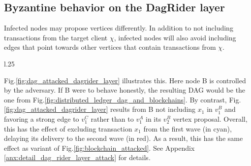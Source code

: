 


\subsection{Byzantine behavior on the DagRider layer\label{ssec:byz_dagrider_layer}}

Infected nodes may propose vertices differently.
In addition to not including transactions from the target client $\chi$, infected nodes will also avoid including edges that point towards other vertices that contain transactions from $\chi$.


\begin{wrapfigure}{l}{.25\textwidth}
\vspace*{-.3cm}
    \centering
    \scalebox{.75}{}
    \caption{DagRider layer attack}
    \label{fig:dag_attacked_dagrider_layer}
\vspace*{-.4cm}
\end{wrapfigure}

Fig.\ref{fig:dag_attacked_dagrider_layer} illustrates this.
Here node B is controlled by the adversary.
If B were to behave honestly, the resulting DAG would be the one from Fig.\ref{fig:distributed_ledger_dag_and_blockchains}.
By contrast, Fig.\ref{fig:dag_attacked_dagrider_layer} results from B not including $x_1$ in $v_1^B$ and favoring a strong edge to $v_1^C$ rather than to $v_1^A$ in its $v_2^B$ vertex proposal.
Overall, this has the effect of excluding transaction $x_1$ from the first wave (in cyan), delaying its delivery to the second wave (in red). As a result, this has the same effect as variant  of Fig.\ref{fig:blockchain_attacked}.
See Appendix \ref{anx:detail_dag_rider_layer_attack} for details.



